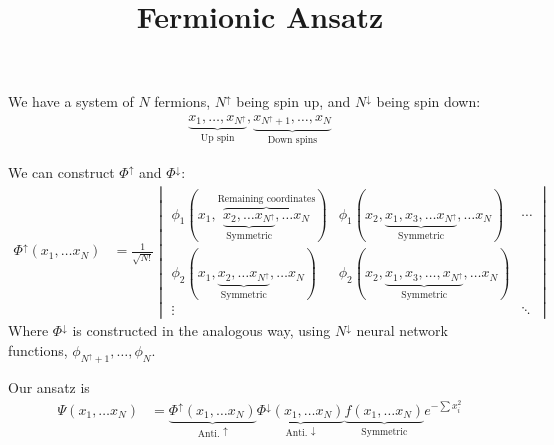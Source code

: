 \documentclass{notes}
\title{Fermionic Ansatz}
\date{}
\begin{document}
We have a system of $N$ fermions, $N^\uparrow$ being spin up, and  $N^\downarrow$  being spin down:
\begin{align*}
	\underbrace{x_1,\dots, x_{N^\uparrow}}_{\text{Up spin}}, \underbrace{x_{N^\uparrow +1}, \dots, x_N}_{\text{Down spins}}
\end{align*}


We can construct  $\Phi^\uparrow$ and  $\Phi^\downarrow$:
 \begin{align*}
	 \Phi^\uparrow(x_1,\dots x_N)&= \frac{1}{\sqrt{N!}} \begin{vmatrix}
		 \phi_1(x_1, \overbrace{\underbrace{x_2,\dots x_{N^\uparrow}}_{\text{Symmetric}}, \dots x_N}^{\text{Remaining coordinates}}) & \phi_1(x_2, \underbrace{x_1,x_3,\dots x_{N^\uparrow}}_{\text{Symmetric}}, \dots x_N) & \cdots\\ 
		 \phi_2(x_1, \underbrace{x_2, \dots x_{N^\uparrow}}_{\text{Symmetric}}, \dots x_N) & \phi_2(x_2, \underbrace{x_1,x_3,\dots, x_{N^\uparrow}}_{\text{Symmetric}}, \dots x_N)& \\ 
		 \vdots & & \ddots 
	 \end{vmatrix}
\end{align*}
Where $\Phi^\downarrow$ is constructed in the analogous way, using $N^\downarrow$ neural network functions, $\phi_{N^\uparrow +
1}, \dots, \phi_{N}$.

Our ansatz is 
\begin{align*}
	\Psi(x_1,\dots x_N) &=  \underbrace{\Phi^\uparrow(x_1,\dots x_N)}_{\text{Anti. } \uparrow} \underbrace{\Phi^\downarrow(x_1,\dots
	x_N)}_{\text{Anti. } \downarrow} \underbrace{f(x_1,\dots x_N)}_{\text{Symmetric}}e^{-\sum x_i^2}
\end{align*}
\end{document}
